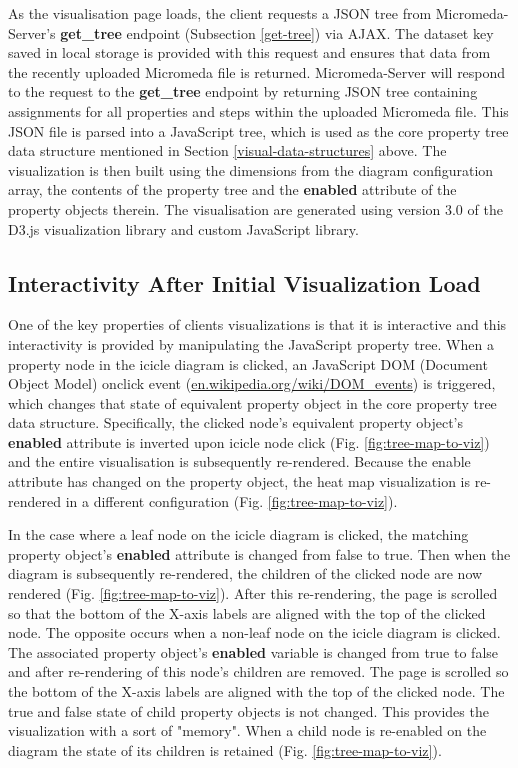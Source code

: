 As the visualisation page loads, the client requests a JSON tree from Micromeda-Server's \textbf{get\_tree} endpoint (Subsection \ref{get-tree}) via AJAX. The dataset key saved in local storage is provided with this request and ensures that data from the recently uploaded Micromeda file is returned. Micromeda-Server will respond to the request to the \textbf{get\_tree} endpoint by returning JSON tree containing assignments for all properties and steps within the uploaded Micromeda file. This JSON file is parsed into a JavaScript tree, which is used as the core property tree data structure mentioned in Section \ref{visual-data-structures} above. The visualization is then built using the dimensions from the diagram configuration array, the contents of the property tree and the \textbf{enabled} attribute of the property objects therein. The visualisation are generated using version 3.0 of the D3.js visualization library \cite{bostock2015d3} and custom JavaScript library.

\subsection{Interactivity After Initial Visualization Load}

One of the key properties of clients visualizations is that it is interactive and this interactivity is provided by manipulating the JavaScript property tree. When a property node in the icicle diagram is clicked, an JavaScript DOM (Document Object Model) onclick event \cite{dom-events} (\href{en.wikipedia.org/wiki/DOM\_events}{en.wikipedia.org/wiki/DOM\_events}) is triggered, which changes that  state of equivalent property object in the core property tree data structure. Specifically, the clicked node's equivalent property object's \textbf{enabled} attribute is inverted upon icicle node click (Fig. \ref{fig:tree-map-to-viz}) and the entire visualisation is subsequently re-rendered. Because the enable attribute has changed on the property object, the heat map visualization is re-rendered in a different configuration (Fig. \ref{fig:tree-map-to-viz}). 

In the case where a leaf node on the icicle diagram is clicked, the matching property object's \textbf{enabled} attribute is changed from false to true. Then when the diagram is subsequently re-rendered, the children of the clicked node are now rendered (Fig. \ref{fig:tree-map-to-viz}). After this re-rendering, the page is scrolled so that the bottom of the X-axis labels are aligned with the top of the clicked node. The opposite occurs when a non-leaf node on the icicle diagram is clicked. The associated property object's \textbf{enabled} variable is changed from true to false and after re-rendering of this node's children are removed. The page is scrolled so the bottom of the X-axis labels are aligned with the top of the clicked node. The true and false state of child property objects is not changed. This provides the visualization with a sort of "memory". When a child node is re-enabled on the diagram the state of its children is retained (Fig. \ref{fig:tree-map-to-viz}).


